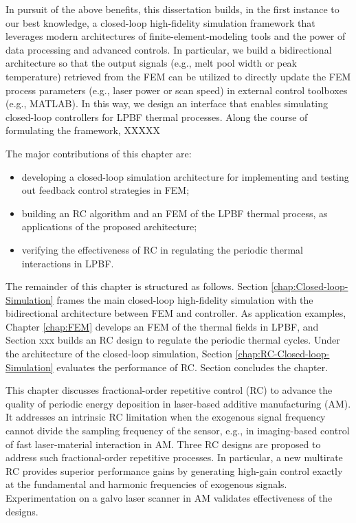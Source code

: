 \documentclass [11pt, proquest] {uwthesis}[2020/02/24]
\begin{document}
In pursuit of the above benefits, this dissertation builds, in the first
instance to our best knowledge, a closed-loop high-fidelity simulation
framework that leverages modern architectures of finite-element-modeling
tools and the power of data processing and advanced controls. In particular,
we build a bidirectional architecture so that the output signals (e.g.,
melt pool width or peak temperature) retrieved from the FEM can be
utilized to directly update the FEM process parameters (e.g., laser
power or scan speed) in external control toolboxes (e.g., MATLAB).
In this way, we design an interface that enables simulating closed-loop
controllers for LPBF thermal processes. Along the course of formulating
the framework, XXXXX

The major contributions of this chapter are:

\begin{itemize}
\item developing a closed-loop simulation architecture for implementing
and testing out feedback control strategies in FEM;
\item building an RC algorithm and an FEM of the LPBF thermal process, as
applications of the proposed architecture;
\item verifying the effectiveness of RC in regulating the periodic thermal
interactions in LPBF.
\end{itemize}
The remainder of this chapter is structured as follows. Section \ref{chap:Closed-loop-Simulation}
frames the main closed-loop high-fidelity simulation with the bidirectional
architecture between FEM and controller. As application examples,
Chapter \ref{chap:FEM} develops an FEM of the
thermal fields in LPBF, and Section xxx
builds an RC design to regulate the periodic thermal cycles. Under
the architecture of the closed-loop simulation, Section \ref{chap:RC-Closed-loop-Simulation}
evaluates the performance of RC. Section concludes
the chapter.

This chapter discusses fractional-order repetitive control (RC) to advance
the quality of periodic energy deposition in laser-based additive
manufacturing (AM). It addresses an intrinsic RC limitation when the
exogenous signal frequency cannot divide the sampling frequency of
the sensor, e.g., in imaging-based control of fast laser-material
interaction in AM. Three RC designs are proposed to address such fractional-order
repetitive processes. In particular, a new multirate RC provides superior
performance gains by generating high-gain control exactly at the fundamental
and harmonic frequencies of exogenous signals. Experimentation on
a galvo laser scanner in AM validates effectiveness of the designs.
\end{document}
